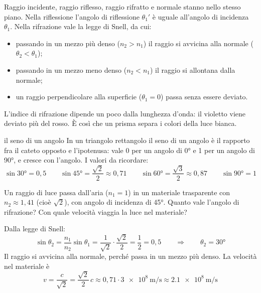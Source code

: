 Raggio incidente, raggio riflesso, raggio rifratto e normale stanno nello stesso piano. Nella riflessione l'angolo di riflessione $\theta_1'$ è uguale all'angolo di incidenza $\theta_1$. Nella rifrazione vale la legge di Snell, da cui:
\begin{itemize}
  \item passando in un mezzo più denso ($n_2 > n_1$) il raggio si avvicina alla normale ($\theta_2 < \theta_1$);
  \item passando in un mezzo meno denso ($n_2 < n_1$) il raggio si allontana dalla normale;
  \item un raggio perpendicolare alla superficie ($\theta_1 = 0$) passa senza essere deviato.
\end{itemize}
L'indice di rifrazione dipende un poco dalla lunghezza d'onda: il violetto viene deviato più del rosso. È così che un prisma separa i colori della luce bianca.

\begin{richiamo}{il seno di un angolo}
In un triangolo rettangolo il seno di un angolo è il rapporto fra il cateto opposto e l'ipotenusa: vale 0 per un angolo di \ang{0} e 1 per un angolo di \ang{90}, e cresce con l'angolo. I valori da ricordare:
\[
  \sin \ang{30} = 0{,}5 \qquad \sin \ang{45} = \frac{\sqrt 2}{2} \approx 0{,}71 \qquad \sin \ang{60} = \frac{\sqrt 3}{2} \approx 0{,}87 \qquad \sin \ang{90} = 1
\]
\end{richiamo}

\begin{esempio}
Un raggio di luce passa dall'aria ($n_1 = 1$) in un materiale trasparente con $n_2 \approx 1{,}41$ (cioè $\sqrt 2$), con angolo di incidenza di \ang{45}. Quanto vale l'angolo di rifrazione? Con quale velocità viaggia la luce nel materiale?

Dalla legge di Snell:
\[
  \sin\theta_2 = \frac{n_1}{n_2} \sin\theta_1 = \frac{1}{\sqrt 2} \cdot \frac{\sqrt 2}{2} = \frac{1}{2} = 0{,}5
  \qquad\Longrightarrow\qquad
  \theta_2 = \ang{30}
\]
Il raggio si avvicina alla normale, perché passa in un mezzo più denso. La velocità nel materiale è
\[
  v = \frac{c}{\sqrt 2} = \frac{\sqrt 2}{2}\,c \approx 0{,}71 \cdot \SI{3e8}{\metre\per\second} \approx \SI{2,1e8}{\metre\per\second}
\]
\end{esempio}


